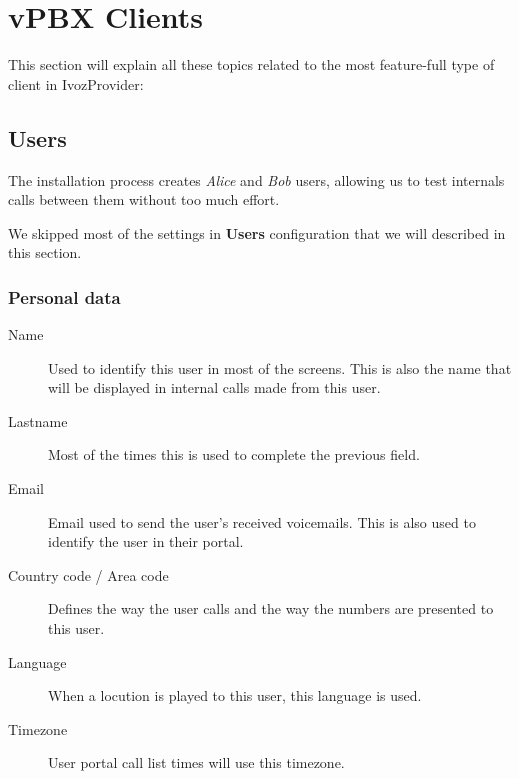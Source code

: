\documentclass[letterpaper,10pt,english]{sphinxmanual}
\begin{document}
\section{vPBX Clients}
\label{administration_portal/client/vpbx/index:vpbx-clients}\label{administration_portal/client/vpbx/index::doc}
This section will explain all these topics related to the most feature-full type of client in IvozProvider:


\subsection{Users}
\label{administration_portal/client/vpbx/users::doc}\label{administration_portal/client/vpbx/users:users}\label{administration_portal/client/vpbx/users:id1}
The installation process creates \emph{Alice} and \emph{Bob} users, allowing us
to test internals calls between them without too much effort.

We skipped most of the settings in \textbf{Users} configuration that we will described
in this section.


\subsubsection{Personal data}
\label{administration_portal/client/vpbx/users:personal-data}\begin{description}
\item[{Name}] \leavevmode{}\label{administration_portal/client/vpbx/users:term-name}
Used to identify this user in most of the screens. This is also the
name that will be displayed in internal calls made from this user.

\item[{Lastname}] \leavevmode{}\label{administration_portal/client/vpbx/users:term-lastname}
Most of the times this is used to complete the previous field.

\item[{Email}] \leavevmode{}\label{administration_portal/client/vpbx/users:term-email}
Email used to send the user's received voicemails. This is also used to
identify the user in their portal.

\item[{Country code / Area code}] \leavevmode{}\label{administration_portal/client/vpbx/users:term-country-code-area-code}
Defines the way the user calls and the way the numbers are presented to
this user.

\item[{Language}] \leavevmode{}\label{administration_portal/client/vpbx/users:term-language}
When a locution is played to this user, this language is used.

\item[{Timezone}] \leavevmode{}\label{administration_portal/client/vpbx/users:term-timezone}
User portal call list times will use this timezone.

\end{description}
\end{document}
